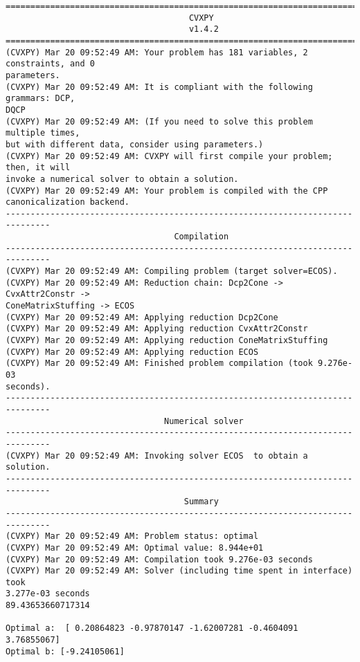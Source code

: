 \documentclass[11pt]{article}
\begin{document}
    \begin{Verbatim}[commandchars=\\\{\}]
===============================================================================
                                     CVXPY
                                     v1.4.2
===============================================================================
(CVXPY) Mar 20 09:52:49 AM: Your problem has 181 variables, 2 constraints, and 0
parameters.
(CVXPY) Mar 20 09:52:49 AM: It is compliant with the following grammars: DCP,
DQCP
(CVXPY) Mar 20 09:52:49 AM: (If you need to solve this problem multiple times,
but with different data, consider using parameters.)
(CVXPY) Mar 20 09:52:49 AM: CVXPY will first compile your problem; then, it will
invoke a numerical solver to obtain a solution.
(CVXPY) Mar 20 09:52:49 AM: Your problem is compiled with the CPP
canonicalization backend.
-------------------------------------------------------------------------------
                                  Compilation
-------------------------------------------------------------------------------
(CVXPY) Mar 20 09:52:49 AM: Compiling problem (target solver=ECOS).
(CVXPY) Mar 20 09:52:49 AM: Reduction chain: Dcp2Cone -> CvxAttr2Constr ->
ConeMatrixStuffing -> ECOS
(CVXPY) Mar 20 09:52:49 AM: Applying reduction Dcp2Cone
(CVXPY) Mar 20 09:52:49 AM: Applying reduction CvxAttr2Constr
(CVXPY) Mar 20 09:52:49 AM: Applying reduction ConeMatrixStuffing
(CVXPY) Mar 20 09:52:49 AM: Applying reduction ECOS
(CVXPY) Mar 20 09:52:49 AM: Finished problem compilation (took 9.276e-03
seconds).
-------------------------------------------------------------------------------
                                Numerical solver
-------------------------------------------------------------------------------
(CVXPY) Mar 20 09:52:49 AM: Invoking solver ECOS  to obtain a solution.
-------------------------------------------------------------------------------
                                    Summary
-------------------------------------------------------------------------------
(CVXPY) Mar 20 09:52:49 AM: Problem status: optimal
(CVXPY) Mar 20 09:52:49 AM: Optimal value: 8.944e+01
(CVXPY) Mar 20 09:52:49 AM: Compilation took 9.276e-03 seconds
(CVXPY) Mar 20 09:52:49 AM: Solver (including time spent in interface) took
3.277e-03 seconds
89.43653660717314

Optimal a:  [ 0.20864823 -0.97870147 -1.62007281 -0.4604091   3.76855067]
Optimal b: [-9.24105061]
    \end{Verbatim}
\end{document}
